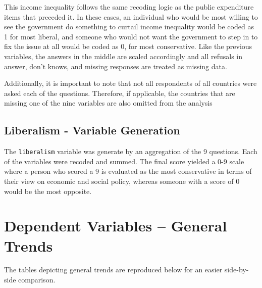 \documentclass[12pt, titlepage]{article}
\newcommand\txt{\texttt}
\begin{document}
\begin{appendices}
This income inequality follows the same recoding logic as the public expenditure items that preceded it. In these cases, an individual who would be most willing to see the government do something to curtail income inequality would be coded as 1 for most liberal, and someone who would not want the government to step in to fix the issue at all would be coded as 0, for most conservative. Like the previous variables, the answers in the middle are scaled accordingly and all refusals in answer, don't knows, and missing responses are treated as missing data.

Additionally, it is important to note that not all respondents of all countries were asked each of the questions. Therefore, if applicable, the countries that are missing one of the nine variables are also omitted from the analysis

\subsection{Liberalism - Variable Generation}

The \txt{liberalism} variable was generate by an aggregation of the 9 questions. Each of the variables were recoded and summed. The final score yielded a 0-9 scale where a person who scored a 9 is evaluated as the most conservative in terms of their view on economic and social policy, whereas someone with a score of 0 would be the most opposite.

\clearpage 


\section{Dependent Variables -- General Trends}
\label{AppendixD}

The tables depicting general trends are reproduced below for an easier side-by-side comparison.


\end{appendices}
\end{document}
